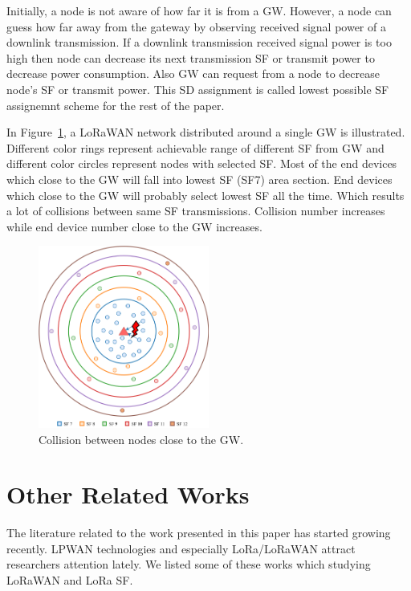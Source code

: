 \documentclass[conference]{IEEEtran}
\begin{document}
\par Initially, a node is not aware of how far it is from a GW. However, a node can guess how far away from the gateway by observing received signal power of a downlink transmission. If a downlink transmission received signal power is too high then node can decrease its next transmission SF or transmit power to decrease power consumption.
Also GW can request from a node to decrease node's SF or transmit power. This SD assignment is called lowest possible SF assignemnt scheme for the rest of the paper.

\par In Figure~\ref{fig:collision}, a LoRaWAN network distributed around a single GW is illustrated. Different color rings represent achievable range of different SF from GW and different color circles represent nodes with selected SF. Most of the end devices which close to the GW will fall into lowest SF (SF7) area section. End devices which close to the GW will probably select lowest SF all the time. Which results a lot of collisions between same SF transmissions. Collision number increases while end device number close to the GW increases.

\begin{figure}
\centering
\includegraphics[width=0.5\textwidth]{collision}
\caption{Collision between nodes close to the GW.}
\label{fig:collision}
\end{figure}


\section{Other Related Works} \label{Other Related Works}
The literature related to the work presented in this paper has started growing recently. LPWAN technologies and especially LoRa/LoRaWAN attract researchers attention lately. We listed some of these works which studying LoRaWAN and LoRa SF.
\end{document}
